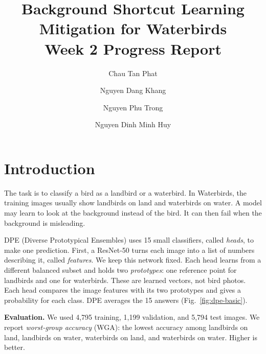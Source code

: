 \documentclass[runningheads]{llncs}
\makeatletter
\newenvironment{methodfigure}{\par\medskip\noindent
  \begin{minipage}{\linewidth}\centering\def\@captype{figure}}
  {\end{minipage}\par\medskip}
\makeatother
\begin{document}
\title{Background Shortcut Learning Mitigation for Waterbirds\texorpdfstring{\\}{: }
Week 2 Progress Report}
\author{Chau Tan Phat \and
Nguyen Dang Khang \and
Nguyen Phu Trong \and
Nguyen Dinh Minh Huy}
\maketitle

\raggedbottom
\section{Introduction}
The task is to classify a bird as a landbird or a waterbird. In Waterbirds, the training images usually show landbirds on land and waterbirds on water. A model may learn to look at the background instead of the bird. It can then fail when the background is misleading.

DPE (Diverse Prototypical Ensembles) uses 15 small classifiers, called \emph{heads}, to make one prediction. First, a ResNet-50 turns each image into a list of numbers describing it, called \emph{features}. We keep this network fixed. Each head learns from a different balanced subset and holds two \emph{prototypes}: one reference point for landbirds and one for waterbirds. These are learned vectors, not bird photos. Each head compares the image features with its two prototypes and gives a probability for each class. DPE averages the 15 answers (Fig.~\ref{fig:dpe-basic}).

\begin{methodfigure}

\caption{Original DPE. Each head uses its own pair of reference points. All 15 answers count equally.}
\label{fig:dpe-basic}
\end{methodfigure}

\textbf{Evaluation.} We used 4,795 training, 1,199 validation, and 5,794 test images. We report \emph{worst-group accuracy} (WGA): the lowest accuracy among landbirds on land, landbirds on water, waterbirds on land, and waterbirds on water. Higher is better.
\end{document}

